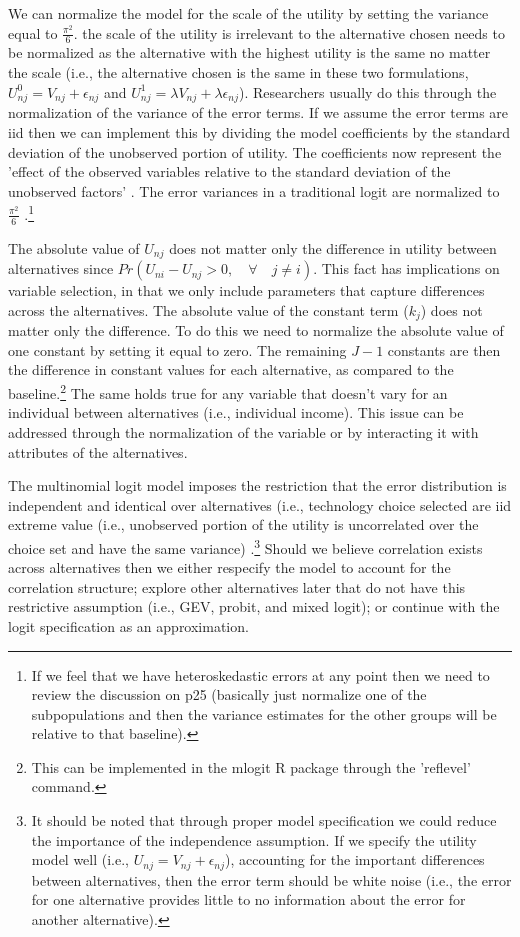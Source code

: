 \documentclass[10pt]{amsart}
\begin{document}
We can normalize the model for the scale of the utility by setting the variance equal to $\frac{\pi^2}{6}$. 
the scale of the utility is irrelevant to the alternative chosen  needs to be normalized as the alternative with the highest utility is the same no matter the scale (i.e., the alternative chosen is the same in these two formulations, $U^0_{nj} = V_{nj} + \epsilon_{nj}$ and $U^1_{nj} = \lambda V_{nj} + \lambda \epsilon_{nj}$).
Researchers usually do this through the normalization of the variance of the error terms. 
If we assume the error terms are iid then we can implement this by dividing the model coefficients by the standard deviation of the unobserved portion of utility.
The coefficients now represent the 'effect of the observed variables relative to the standard deviation of the unobserved factors' \parencite[24]{train:2009aa}.  
The error variances in a traditional logit are normalized to $\frac{\pi^2}{6}$ \parencite{train:2009aa}.\footnote{If we feel that we have heteroskedastic errors at any point then we need to review the discussion on p25 (basically just normalize one of the subpopulations and then the variance estimates for the other groups will be relative to that baseline).} 

The absolute value of $U_{nj}$ does not matter only the difference in utility between alternatives since $Pr(U_{ni} -U_{nj} > 0, \quad \forall \quad j \neq i)$.
This fact has implications on variable selection, in that we only include parameters that capture differences across the alternatives. 
The absolute value of the constant term ($k_{j}$) does not matter only the difference.
To do this we need to normalize the absolute value of one constant by setting it equal to zero.
The remaining $J-1$ constants are then the difference in constant values for each alternative, as compared to the baseline.\footnote{This can be implemented in the mlogit R package through the 'reflevel' command.}    
The same holds true for any variable that doesn't vary for an individual between alternatives (i.e., individual income).
This issue can be addressed through the normalization of the variable or by interacting it with attributes of the alternatives. 

The multinomial logit model imposes the restriction that the error distribution is independent and identical over alternatives (i.e., technology choice selected are iid extreme value (i.e., unobserved portion of the utility is uncorrelated over the choice set and have the same variance) \parencite{wen2001generalized}.\footnote{It should be noted that through proper model specification we could reduce the importance of the independence assumption. 
If we specify the utility model well (i.e., $U_{nj} = V_{nj} + \epsilon_{nj}$), accounting for the important differences between alternatives, then the error term should be white noise (i.e., the error for one alternative provides little to no information about the error for another alternative).} 
Should we believe correlation exists across alternatives then we either respecify the model to account for the correlation structure; explore other alternatives later that do not have this restrictive assumption (i.e., GEV, probit, and mixed logit); or continue with the logit specification as an approximation. 
 
\end{document}
